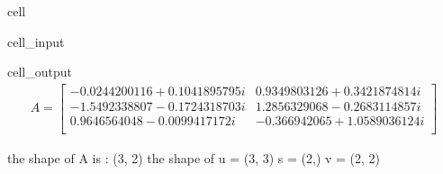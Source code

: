 \documentclass[letterpaper,10pt,english]{jupyterBook}
\begin{document}
\begin{sphinxuseclass}{cell}\begin{sphinxVerbatimInput}

\begin{sphinxuseclass}{cell_input}
\begin{sphinxVerbatim}[commandchars=\\\{\}]

   
  


     

    
\end{sphinxVerbatim}

\end{sphinxuseclass}\end{sphinxVerbatimInput}
\begin{sphinxVerbatimOutput}

\begin{sphinxuseclass}{cell_output}\begin{equation*}
\begin{split}
A=
\begin{bmatrix}
-0.0244200116 + 0.1041895795 i & 0.9349803126 + 0.3421874814 i  \\
 -1.5492338807 - 0.1724318703 i & 1.2856329068 - 0.2683114857 i  \\
 0.9646564048 - 0.0099417172 i & -0.366942065 + 1.0589036124 i  \\
 \end{bmatrix}
\end{split}
\end{equation*}
\begin{sphinxVerbatim}[commandchars=\\\{\}]
the shape of A is : (3, 2)
the shape of u = (3, 3)  s = (2,)  v = (2, 2)
\end{sphinxVerbatim}


\end{sphinxuseclass}
\end{sphinxVerbatimOutput}
\end{sphinxuseclass}
\end{document}
